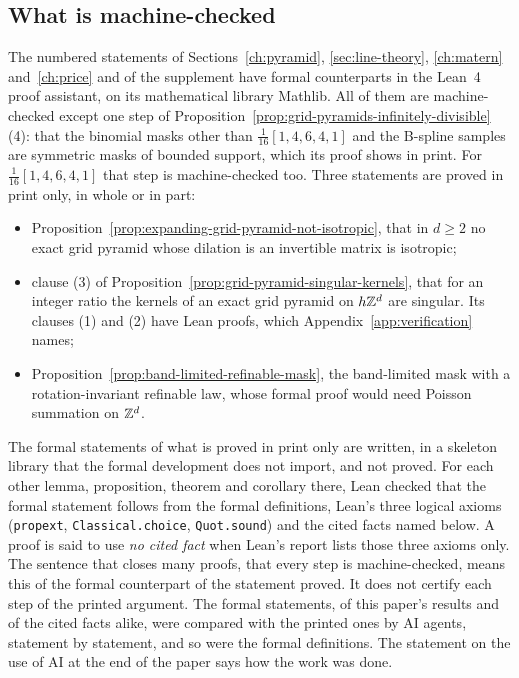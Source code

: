 \subsection{What is machine-checked}
\label{sec:trust}
The numbered statements of Sections~\ref{ch:pyramid}, \ref{sec:line-theory}, \ref{ch:matern}
and~\ref{ch:price} and of the supplement have formal counterparts in the Lean~4 proof assistant, on
its mathematical library Mathlib. All of them are machine-checked except one step of
Proposition~\ref{prop:grid-pyramids-infinitely-divisible}(4): that the binomial masks other than
$\tfrac1{16}[1,4,6,4,1]$ and the B-spline samples are symmetric masks of bounded support, which its
proof shows in print. For $\tfrac1{16}[1,4,6,4,1]$ that step is machine-checked too. Three
statements are proved in print only, in whole or in part:
\begin{itemize}
\item Proposition~\ref{prop:expanding-grid-pyramid-not-isotropic}, that in $d \ge 2$ no exact grid
pyramid whose dilation is an invertible matrix is isotropic;
\item clause (3) of Proposition~\ref{prop:grid-pyramid-singular-kernels}, that for an integer ratio
the kernels of an exact grid pyramid on $h\mathbb{Z}^d$ are singular. Its clauses (1) and (2) have Lean
proofs, which Appendix~\ref{app:verification} names;
\item Proposition~\ref{prop:band-limited-refinable-mask}, the band-limited mask with a
rotation-invariant refinable law, whose formal proof would need Poisson summation on $\mathbb{Z}^d$.
\end{itemize}
The formal statements of what is proved in print only are written, in a skeleton library that the
formal development does not import, and not proved. For each other lemma,
proposition, theorem and corollary there, Lean checked that the formal statement follows from the
formal definitions, Lean's three logical axioms (\texttt{propext}, \texttt{Classical.choice},
\texttt{Quot.sound}) and the cited facts named below. A proof is said to use \emph{no cited fact}
when Lean's report lists those three axioms only. The sentence that closes many proofs, that every
step is machine-checked, means this of the formal counterpart of the statement proved. It does not
certify each step of the printed argument. The formal statements, of this paper's results and of the cited facts
alike, were compared with the printed ones by AI agents, statement by statement, and so were the
formal definitions. The statement on
the use of AI at the end of the paper says how the work was done.

